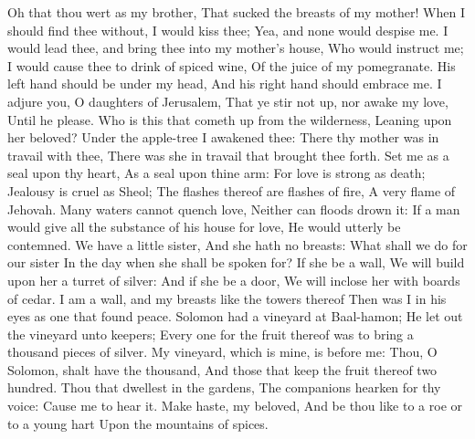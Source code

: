 Oh that thou wert as my brother, That sucked the breasts of my mother! When I should find thee without, I would kiss thee; Yea, and none would despise me.  I would lead thee, and bring thee into my mother’s house, Who would instruct me; I would cause thee to drink of spiced wine, Of the juice of my pomegranate.  His left hand should be under my head, And his right hand should embrace me.  I adjure you, O daughters of Jerusalem, That ye stir not up, nor awake my love, Until he please.  Who is this that cometh up from the wilderness, Leaning upon her beloved? Under the apple-tree I awakened thee: There thy mother was in travail with thee, There was she in travail that brought thee forth.  Set me as a seal upon thy heart, As a seal upon thine arm: For love is strong as death; Jealousy is cruel as Sheol; The flashes thereof are flashes of fire, A very flame of Jehovah.  Many waters cannot quench love, Neither can floods drown it: If a man would give all the substance of his house for love, He would utterly be contemned.  We have a little sister, And she hath no breasts: What shall we do for our sister In the day when she shall be spoken for?  If she be a wall, We will build upon her a turret of silver: And if she be a door, We will inclose her with boards of cedar.  I am a wall, and my breasts like the towers thereof Then was I in his eyes as one that found peace.  Solomon had a vineyard at Baal-hamon; He let out the vineyard unto keepers; Every one for the fruit thereof was to bring a thousand pieces of silver.  My vineyard, which is mine, is before me: Thou, O Solomon, shalt have the thousand, And those that keep the fruit thereof two hundred.  Thou that dwellest in the gardens, The companions hearken for thy voice: Cause me to hear it.  Make haste, my beloved, And be thou like to a roe or to a young hart Upon the mountains of spices. 